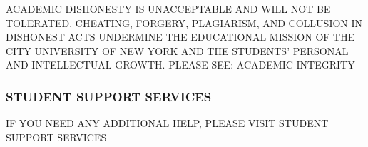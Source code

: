 \documentclass[
  letterpaper,
  DIV=11,
  numbers=noendperiod]{scrartcl}
\begin{document}
ACADEMIC DISHONESTY IS UNACCEPTABLE AND WILL NOT BE TOLERATED. CHEATING,
FORGERY, PLAGIARISM, AND COLLUSION IN DISHONEST ACTS UNDERMINE THE
EDUCATIONAL MISSION OF THE CITY UNIVERSITY OF NEW YORK AND THE STUDENTS'
PERSONAL AND INTELLECTUAL GROWTH. PLEASE SEE: ACADEMIC INTEGRITY

\subsubsection{STUDENT SUPPORT SERVICES}\label{student-support-services}

IF YOU NEED ANY ADDITIONAL HELP, PLEASE VISIT STUDENT SUPPORT SERVICES
\end{document}
